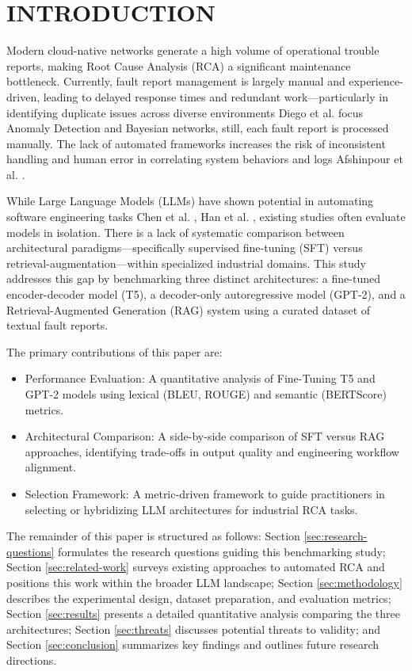 \documentclass[10pt,twocolumn,journal]{IEEEtran}
\begin{document}
\section{INTRODUCTION}
\label{sec:introduction}

Modern cloud-native networks generate a high volume of operational trouble reports, making Root Cause Analysis (RCA) a significant maintenance bottleneck. Currently, fault report management is largely manual and experience-driven, leading to delayed response times and redundant work—particularly in identifying duplicate issues across diverse environments Diego et al. \cite{10979844} focus Anomaly Detection and Bayesian networks, still, each fault report is processed manually. The lack of automated frameworks increases the risk of inconsistent handling and human error in correlating system behaviors and logs Afshinpour et al. \cite{10684586}.

While Large Language Models (LLMs) have shown potential in automating software engineering tasks Chen et al. \cite{chen2024automatic}, Han et al. \cite{10765066}, existing studies often evaluate models in isolation. There is a lack of systematic comparison between architectural paradigms—specifically supervised fine-tuning (SFT) versus retrieval-augmentation—within specialized industrial domains. This study addresses this gap by benchmarking three distinct architectures: a fine-tuned encoder-decoder model (T5), a decoder-only autoregressive model (GPT-2), and a Retrieval-Augmented Generation (RAG) system using a curated dataset of textual fault reports.

The primary contributions of this paper are:
\begin{itemize}
    \item Performance Evaluation: A quantitative analysis of Fine-Tuning T5 and GPT-2 models using lexical (BLEU, ROUGE) and semantic (BERTScore) metrics.
    \item Architectural Comparison: A side-by-side comparison of SFT versus RAG approaches, identifying trade-offs in output quality and engineering workflow alignment.
    \item Selection Framework: A metric-driven framework to guide practitioners in selecting or hybridizing LLM architectures for industrial RCA tasks.
\end{itemize}

The remainder of this paper is structured as follows: Section \ref{sec:research-questions} formulates the research questions guiding this benchmarking study; Section \ref{sec:related-work} surveys existing approaches to automated RCA and positions this work within the broader LLM landscape; Section \ref{sec:methodology} describes the experimental design, dataset preparation, and evaluation metrics; Section \ref{sec:results} presents a detailed quantitative analysis comparing the three architectures; Section \ref{sec:threats} discusses potential threats to validity; and Section \ref{sec:conclusion} summarizes key findings and outlines future research directions.
\end{document}
